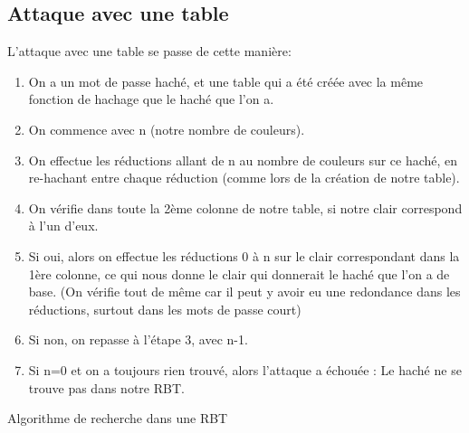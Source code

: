 \documentclass[french,12pt]{article}
\begin{document}
         \subsection{Attaque avec une table} \label{section:Attaque}
         L'attaque avec une table se passe de cette manière:
         \begin{enumerate}
             \item On a un mot de passe haché, et une table qui a été créée avec la même fonction de hachage que le haché que l'on a.
             \item On commence avec n (notre nombre de couleurs).
             \item On effectue les réductions allant de n au nombre de couleurs sur ce haché, en re-hachant entre chaque réduction (comme lors de la création de notre table).
             \item On vérifie dans toute la 2ème colonne de notre table, si notre clair correspond à l'un d'eux.
             \item Si oui, alors on effectue les réductions 0 à n sur le clair correspondant dans la 1ère colonne, ce qui nous donne le clair qui donnerait le haché que l'on a de base. (On vérifie tout de même car il peut y avoir eu une redondance dans les réductions, surtout dans les mots de passe court)
             \item Si non, on repasse à l'étape 3, avec n-1.
             \item Si n=0 et on a toujours rien trouvé, alors l'attaque a échouée : Le haché ne se trouve pas dans notre RBT.
         \end{enumerate}
         
         \begin{algorithm}[H]
        \DontPrintSemicolon
        \caption{Algorithme de recherche dans une RBT}
        \label{algo:RBTSearch}
        \end{algorithm}
\end{document}
